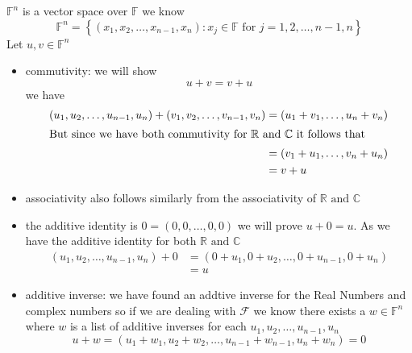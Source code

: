 \documentclass[11pt]{book}
\begin{document}
\begin{ver}
    $\mathbb{F}   ^{n} $ is a vector space over $\mathbb{F}  $  we know 
    \[
        \mathbb{F} ^{n} = \left\{ \left( x_{1} , x_{2} , \dotsc  , x_{n - 1} , x_{n}  \right) : x_{j} \in \mathbb{F} \text{ for } j= 1, 2,  \ldots,  n-1, n  \right\} 
    \]
    Let $u, v \in \mathbb{F}^{n} $ 
    \begin{itemize}
        \item commutivity: we will show 
            \[
            u + v= v + u
            \]
            we have 
            \begin{align*}
                \left( u_{1} , u_{2} , \dotsc  , u_{n - 1} , u_{n}  \right)  + \left( v_{1} , v_{2} , \dotsc  , v_{n - 1} , v_{n}  \right) &= \left( u_{1} + v_{1} , \ldots  , u_{n} + v_{n}  \right) \\
                \intertext{But since we have both commutivity for $\mathbb{R} $ and $\mathbb{C} $ it follows that }
                                                                                                                                           &= \left( v_{1} + u_{1} ,\ldots , v_{n} + u_{n}  \right)   \\ 
                                                                                                                                           &= v + u 
            \end{align*}
        \item associativity also follows similarly from the associativity of $\mathbb{R} \text{ and } \mathbb{C} $ 
        \item the additive identity is $0 = \left( 0, 0,  \ldots,  0, 0 \right) $ we will prove $u + 0= u$. As we have the additive identity for both $\mathbb{R} \text{ and } \mathbb{C} $ 
            \begin{align*}
                \left( u_{1} , u_{2} , \dotsc  , u_{n - 1} , u_{n}  \right)  + 0 &=  \left( 0 + u_{1} , 0 + u_{2} , \dotsc  , 0 + u_{n - 1} , 0 + u_{n}  \right) \\ 
                &=u 
            \end{align*}
        \item additive inverse: we have found an addtive inverse for the Real Numbers and complex numbers so if we are dealing with $\mathcal{F} $ we know there exists a $w \in \mathbb{F}^{n}  $ where $w$ is a list of additive inverses for each $u_{1} , u_{2} , \dotsc  , u_{n - 1} , u_{n} $ 
            \[
                u  + w= \left( u_{1} + w_{1} , u_{2} + w_{2} , \dotsc  , u_{n - 1} + w_{n - 1} , u_{n} + w_{n}  \right) = 0
\]
\end{itemize}
\end{ver}
\end{document}
